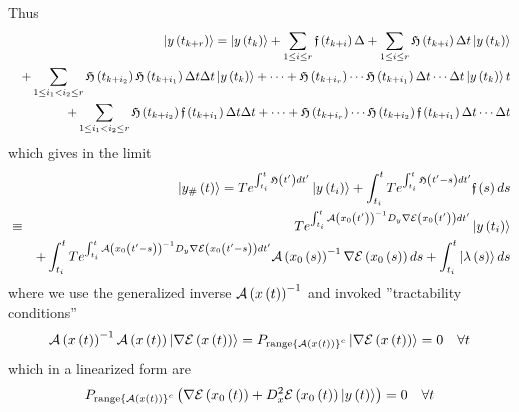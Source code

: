 Thus 
\begin{eqnarray}
&&\left| y\left( t_{k+r}\right) \right\rangle =\left| y\left( t_{k}\right)
\right\rangle +\sum_{1\leq i\leq r}{\frak f}\left( t_{k+i}\right) \Delta
+\sum_{1\leq i\leq r}{\frak H}\left( t_{k+i}\right) \Delta t\left| y\left(
t_{k}\right) \right\rangle  \nonumber \\
&&+\sum_{1\leq i_{1}<i_{2}\leq r}{\frak H}\left( t_{k+i_{2}}\right) {\frak H}%
\left( t_{k+i_{1}}\right) \Delta t\Delta t\left| y\left( t_{k}\right)
\right\rangle +\cdots +{\frak H}\left( t_{k+i_{r}}\right) \cdots {\frak H}%
\left( t_{k+i_{1}}\right) \Delta t\cdots \Delta t\left| y\left( t_{k}\right)
\right\rangle t  \nonumber \\
&&+\sum_{1\leq i_{1}<i_{2}\leq r}{\frak H}\left( t_{k+i_{2}}\right) {\frak f}%
\left( t_{k+i_{1}}\right) \Delta t\Delta t+\cdots +{\frak H}\left(
t_{k+i_{r}}\right) \cdots {\frak H}\left( t_{k+i_{2}}\right) {\frak f}\left(
t_{k+i_{1}}\right) \Delta t\cdots \Delta t
\end{eqnarray}%
which gives in the limit 
\begin{eqnarray}
&&\left| y_{\#}\left( t\right) \right\rangle ={\LARGE T}e^{\int_{t_{i}}^{t}%
{\frak H}\left( t^{\prime }\right) dt^{\prime }}\left| y\left( t_{i}\right)
\right\rangle +\int_{t_{i}}^{t}{\LARGE T}e^{\int_{t_{i}}^{t}{\frak H}\left(
t^{\prime }-s\right) dt^{\prime }}{\frak f}\left( s\right) ds  \nonumber \\
&\equiv &{\LARGE T}e^{\int_{t_{i}}^{t}{\cal A}\left( x_{0}\left( t^{\prime
}\right) \right) ^{-1}D_{y}\nabla {\cal E}\left( x_{0}\left( t^{\prime
}\right) \right) dt^{\prime }}\left| y\left( t_{i}\right) \right\rangle 
\nonumber \\
&&+\int_{t_{i}}^{t}{\LARGE T}e^{\int_{t_{i}}^{t}{\cal A}\left( x_{0}\left(
t^{\prime }-s\right) \right) ^{-1}D_{y}\nabla {\cal E}\left( x_{0}\left(
t^{\prime }-s\right) \right) dt^{\prime }}{\cal A}\left( x_{0}\left(
s\right) \right) ^{-1}\nabla {\cal E}\left( x_{0}\left( s\right) \right)
ds+\int_{t_{i}}^{t}\left| \lambda \left( s\right) \right\rangle ds
\end{eqnarray}%
where we use the generalized inverse ${\cal A}\left( x\left( t\right)
\right) ^{-1}$ and invoked ''tractability conditions'' 
\begin{equation}
{\cal A}\left( x\left( t\right) \right) ^{-1}{\cal A}\left( x\left( t\right)
\right) \left| \nabla {\cal E}\left( x\left( t\right) \right) \right\rangle
=P_{%
\mathop{\rm range}%
\left\{ {\cal A}\left( x\left( t\right) \right) \right\} ^{c}}\left| \nabla 
{\cal E}\left( x\left( t\right) \right) \right\rangle =0\quad \forall t
\end{equation}%
which in a linearized form are 
\begin{equation}
P_{%
\mathop{\rm range}%
\left\{ {\cal A}\left( x\left( t\right) \right) \right\} ^{c}}\left( \nabla 
{\cal E}\left( x_{0}\left( t\right) \right) +D_{x}^{2}{\cal E}\left(
x_{0}\left( t\right) \right) \left| y\left( t\right) \right\rangle \right)
=0\quad \forall t
\end{equation}

